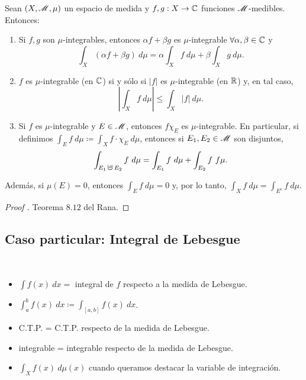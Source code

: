\begin{theorem}
	Sean $(X, \mathscr{M}, \mu)$ un espacio de medida y $f,g : X \to \mathbb{C}$ funciones $\mathscr{M}$-medibles. Entonces:
	\begin{enumerate}
		\item Si $f,g$ son $\mu$-integrables, entonces $\alpha f + \beta g$ es $\mu$-integrable $\forall \alpha, \beta \in \mathbb{C}$ y
		\[ \int_{X} (\alpha f + \beta g) \ d\mu = \alpha \int_{X} f \ d\mu + \beta \int_{X} g \ d\mu. \]

		\item $f$ es $\mu$-integrable (en $\mathbb{C}$) si y sólo si $|f|$ es $\mu$-integrable (en $\mathbb{R}$) y, en tal caso,
		\[ \left| \int_{X} f \ d\mu \right| \leq \int_{X} |f| \ d\mu. \]

		\item Si $f$ es $\mu$-integrable y $E \in \mathscr{M}$, entonces $f \chi_{E}$ es $\mu$-integrable. En particular, si definimos $\int_{E} f \ d\mu \coloneq \int_{X} f \cdot \chi_{E} \ d\mu$, entonces si $E_{1},E_{2} \in \mathscr{M}$ son disjuntos,
		\[ \int_{E_{1} \cupd E_{2}} f \ d\mu = \int_{E_{1}} f \ d\mu + \int_{E_{2}} f \ f\mu. \]
	\end{enumerate}
	Además, si $\mu(E) = 0$, entonces $\int_{E} f \ d\mu = 0$ y, por lo tanto, $\int_{X} f \ d\mu = \int_{E^{c}} f \ d\mu$.
\end{theorem}
\begin{proof}[Proof ]
	Teorema $8.12$ del Rana.
\end{proof}

\subsection{Caso particular: Integral de Lebesgue}

\begin{notation}~
	\begin{itemize}
		\item $\int f(x) \ dx =$ integral de $f$ respecto a la medida de Lebesgue.

		\item $\int_{a}^{b} f(x) \ dx \coloneq \int_{[a,b]} f(x) \ dx$.

		\item C.T.P. = C.T.P. respecto de la medida de Lebesgue.

		\item integrable = integrable respecto de la medida de Lebesgue.

		\item $\int_{X} f(x) \ d\mu(x)$ cuando queramos destacar la variable de integración.
	\end{itemize}
\end{notation}

